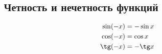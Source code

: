 \subsection*{Четность и нечетность функций}

\begin{align*}
  \sin(-x)  &= - \sin x\\
  \cos(-x)  &= \cos x\\
  \tg(-x)  &= -\tg x
\end{align*}

\hrulefill